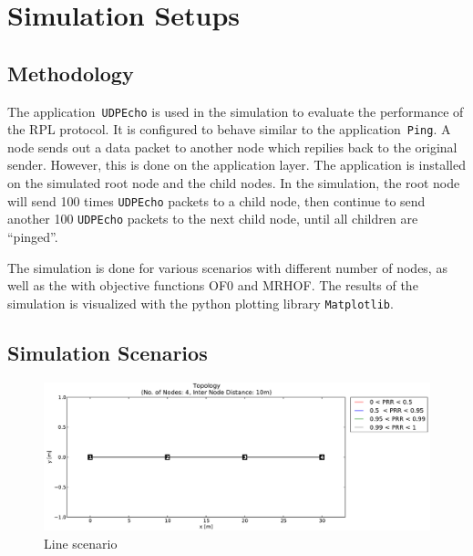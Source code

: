 \section{Simulation Setups}
\label{Sim:Setup}
\subsection{Methodology}
\label{Sim:Method}
The application~\texttt{UDPEcho} is used in the simulation to evaluate the performance of the RPL protocol. It is configured to behave similar to the application~\texttt{Ping}. A node sends out a data packet to another node which repilies back to the original sender. However, this is done on the application layer. The application is installed on the simulated root node and the child nodes. In the simulation, the root node will send 100 times \texttt{UDPEcho} packets to a child node, then continue to send another 100 \texttt{UDPEcho} packets to the next child node, until all children are  ``pinged''.     
\newline

The simulation is done for various scenarios with different number of nodes, as well as the with objective functions OF0 and MRHOF. The results of the simulation is visualized with the python plotting library \texttt{Matplotlib}.

\subsection{Simulation Scenarios}
\label{Sim:Scenarios}
\begin{figure}[!ht]
 	\centering
    \leavevmode
      \includegraphics[scale=0.35]{Pics/results/topo4_dist10_line.pdf}
    \caption{Line scenario}
    \label{fig:scenario_line}
\end{figure}


